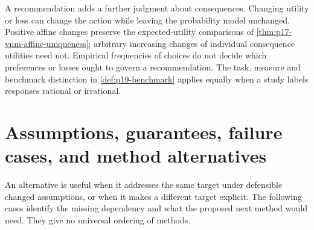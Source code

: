 A recommendation adds a further judgment about consequences. Changing
utility or loss can change the action while leaving the probability model
unchanged. Positive affine changes preserve the expected-utility comparisons
of \cref{thm:p17-vnm-affine-uniqueness}; arbitrary increasing changes of
individual consequence utilities need not. Empirical frequencies of choices
do not decide which preferences or losses ought to govern a recommendation.
The task, measure and benchmark distinction in \cref{def:p19-benchmark}
applies equally when a study labels responses rational or irrational.

\section{Assumptions, guarantees, failure cases, and method alternatives}
\label{sec:p14-evidence-assumptions-alternatives}

An alternative is useful when it addresses the same target under defensible
changed assumptions, or when it makes a different target explicit. The
following cases identify the missing dependency and what the proposed next
method would need. They give no universal ordering of methods.

